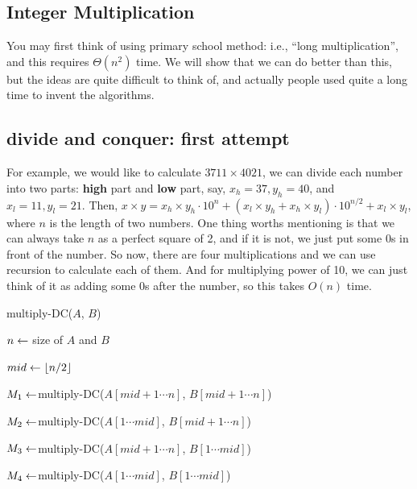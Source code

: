 \begin{spacing}{1.3}
    \newpage
    \section{Integer Multiplication}

    You may first think of using primary school method: 
    i.e., ``long multiplication'', and this requires $\Theta(n^2)$
    time. We will show that we can do better than this, but 
    the ideas are quite difficult to think of, and actually 
    people used quite a long time to invent the algorithms.

    \subsection{divide and conquer: first attempt}

    For example, we would like to calculate $3711\times 4021$,
    we can divide each number into two parts: {\bf high} part 
    and {\bf low} part, say, $x_h=37, y_h=40$, and $x_l=11, y_l=21$.
    Then, $x\times y=x_h\times y_h\cdot 10^n+(x_l\times y_h+x_h\times 
    y_l)\cdot 10^{n/2}+x_l\times y_l$, where $n$ is the length of 
    two numbers. One thing worths mentioning is that we can always 
    take $n$ as a perfect square of 2, and if it is not, we just 
    put some 0s in front of the number.
    So now, there are four multiplications and we can use recursion 
    to calculate each of them. And for multiplying power of 10, 
    we can just think of it as adding some 0s after the number, so 
    this takes $O(n)$ time.

    \begin{algorithm}
        \caption{multiply-DC($A$, $B$)}

        $n\leftarrow $ size of $A$ and $B$


        $mid\leftarrow \lfloor n/2 \rfloor$

        $M_1\leftarrow $multiply-DC($A[mid+1\cdots n]$, $B[mid+1\cdots n]$)
        \qquad {}

        $M_2\leftarrow $multiply-DC($A[1\cdots mid]$, $B[mid+1\cdots n]$)
        \qquad {}

        $M_3\leftarrow $multiply-DC($A[mid+1\cdots n]$, $B[1\cdots mid]$)
        \qquad {}

        $M_4\leftarrow $multiply-DC($A[1\cdots mid]$, $B[1\cdots mid]$)
        \qquad {}


\end{algorithm}
\end{spacing}
